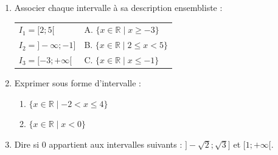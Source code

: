\documentclass[11pt]{article}
\begin{document}
\begin{exercice}
\begin{enumerate}
    \item Associer chaque intervalle à sa description ensembliste :
    \begin{tabular}{ll}
    $I_1 = [2 ; 5[$ & A. $\{x \in \mathbb{R} \mid x \geqslant -3\}$ \\
    $I_2 = ]-\infty ; -1]$ & B. $\{x \in \mathbb{R} \mid 2 \leqslant x < 5\}$ \\
    $I_3 = [-3 ; +\infty[$ & C. $\{x \in \mathbb{R} \mid x \leqslant -1\}$
    \end{tabular}
    \item Exprimer sous forme d'intervalle :
    \begin{enumerate}
        \item $\{x \in \mathbb{R} \mid -2 < x \leqslant 4\}$
        \item $\{x \in \mathbb{R} \mid x < 0\}$
    \end{enumerate}
    \item Dire si $0$ appartient aux intervalles suivants : $]-\sqrt{2} ; \sqrt{3}]$ et $[1 ; +\infty[$.
\end{enumerate}
\end{exercice}
\end{document}
